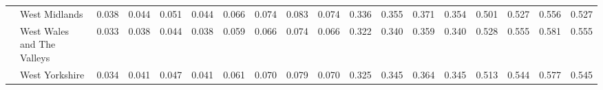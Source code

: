 \begin{tabular}{llrrrrrrrrrrrrrrrr}
 & West Midlands & 0.038 & 0.044 & 0.051 & 0.044 & 0.066 & 0.074 & 0.083 & 0.074 & 0.336 & 0.355 & 0.371 & 0.354 & 0.501 & 0.527 & 0.556 & 0.527 \\
 & West Wales and The Valleys & 0.033 & 0.038 & 0.044 & 0.038 & 0.059 & 0.066 & 0.074 & 0.066 & 0.322 & 0.340 & 0.359 & 0.340 & 0.528 & 0.555 & 0.581 & 0.555 \\
 & West Yorkshire & 0.034 & 0.041 & 0.047 & 0.041 & 0.061 & 0.070 & 0.079 & 0.070 & 0.325 & 0.345 & 0.364 & 0.345 & 0.513 & 0.544 & 0.577 & 0.545 \\
\cline{1-18}
\bottomrule
\end{tabular}
